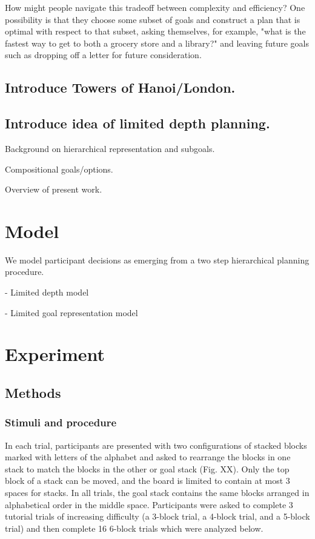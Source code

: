 \documentclass[10pt,letterpaper]{article}
\begin{document}
How might people navigate this tradeoff between complexity and efficiency? One possibility is that they choose some subset of goals and construct a plan that is optimal with respect to that subset, asking themselves, for example, "what is the fastest way to get to both a grocery store and a library?" and leaving future goals such as dropping off a letter for future consideration.




\subsection{Introduce Towers of Hanoi/London.}

\subsection{Introduce idea of limited depth planning.}

Background on hierarchical representation and subgoals.

Compositional goals/options.

Overview of present work.


\section{Model}
We model participant decisions as emerging from a two step hierarchical planning procedure. 

- Limited depth model

- Limited goal representation model



\section{Experiment}

\subsection{Methods}
\subsubsection{Stimuli and procedure}

In each trial, participants are presented with two configurations of stacked blocks marked with letters of the alphabet and asked to rearrange the blocks in one stack to match the blocks in the other or goal stack (Fig. XX). Only the top block of a stack can be moved, and the board is limited to contain at most 3 spaces for stacks. In all trials, the goal stack contains the same blocks arranged in alphabetical order in the middle space. Participants were asked to complete 3 tutorial trials of increasing difficulty (a 3-block trial, a 4-block trial, and a 5-block trial) and then complete 16 6-block trials which were analyzed below.
\end{document}
